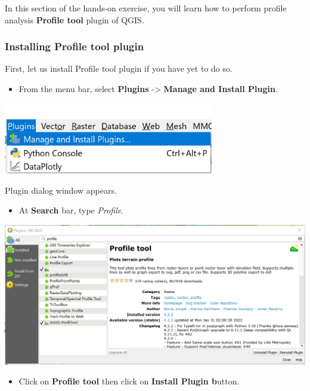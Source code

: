 \documentclass[
  letterpaper,
  DIV=11,
  numbers=noendperiod]{scrreprt}
\providecommand{\tightlist}{%
  \setlength{\itemsep}{0pt}\setlength{\parskip}{0pt}}\usepackage{longtable,booktabs,array}
\begin{document}
In this section of the hands-on exercise, you will learn how to perform
profile analysis \textbf{Profile tool} plugin of QGIS.

\hypertarget{installing-profile-tool-plugin}{%
\subsubsection{Installing Profile tool
plugin}\label{installing-profile-tool-plugin}}

First, let us install Profile tool plugin if you have yet to do so.

\begin{itemize}
\tightlist
\item
  From the menu bar, select \textbf{Plugins} -\textgreater{}
  \textbf{Manage and Install Plugin}.
\end{itemize}

\includegraphics[width=3.61458in,height=\textheight]{./img06/image55.jpg}

Plugin dialog window appears.

\begin{itemize}
\tightlist
\item
  At \textbf{Search} bar, type \emph{Profile}.
\end{itemize}

\includegraphics{./img06/image67.jpg}

\begin{itemize}
\tightlist
\item
  Click on \textbf{Profile tool} then click on \textbf{Install Plugin
  b}utton.
\end{itemize}
\end{document}
